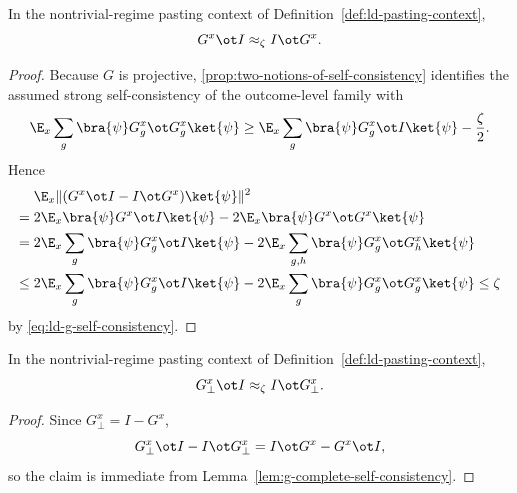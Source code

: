\begin{lemma}\label{lem:g-complete-self-consistency}
	\leanok
	In the nontrivial-regime pasting context of Definition~\ref{def:ld-pasting-context},
	\[
		G^x \ot I \approx_\zeta I \ot G^x.
	\]
\end{lemma}
\begin{proof}
	\leanok
	Because $G$ is projective, \ref{prop:two-notions-of-self-consistency} identifies the assumed strong self-consistency of the outcome-level family with
	\begin{equation}\label{eq:ld-g-self-consistency}
		\E_x \sum_g \bra{\psi} G_g^x \ot G_g^x \ket{\psi}
		\ge
		\E_x \sum_g \bra{\psi} G_g^x \ot I \ket{\psi} - \frac{\zeta}{2}.
	\end{equation}
	Hence
	\begin{align*}
		      & \E_x \|(G^x\ot I - I\ot G^x)\ket{\psi}\|^2                                                              \\
		={}   & 2\E_x \bra{\psi} G^x \ot I \ket{\psi} - 2\E_x \bra{\psi} G^x \ot G^x \ket{\psi}                         \\
		={}   & 2\E_x \sum_g \bra{\psi} G_g^x \ot I \ket{\psi} - 2\E_x \sum_{g,h} \bra{\psi} G_g^x \ot G_h^x \ket{\psi} \\
		\le{} & 2\E_x \sum_g \bra{\psi} G_g^x \ot I \ket{\psi} - 2\E_x \sum_g \bra{\psi} G_g^x \ot G_g^x \ket{\psi}
		\le \zeta
	\end{align*}
	by \ref{eq:ld-g-self-consistency}.
\end{proof}

\begin{corollary}\label{cor:g-bot-self-consistency}
	\leanok
	In the nontrivial-regime pasting context of Definition~\ref{def:ld-pasting-context},
	\[
		G_\bot^x \ot I \approx_\zeta I \ot G_\bot^x.
	\]
\end{corollary}
\begin{proof}
	\leanok
	Since $G_\bot^x = I-G^x$,
	\[
		G_\bot^x \ot I - I \ot G_\bot^x = I \ot G^x - G^x \ot I,
	\]
	so the claim is immediate from Lemma~\ref{lem:g-complete-self-consistency}.
\end{proof}

